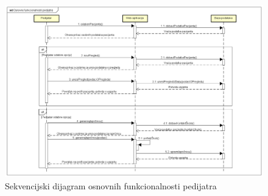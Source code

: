				\begin{figure}[H]
					\includegraphics[scale=0.35]{dijagrami/pedseq1.PNG} %
					\centering
					\caption{Sekvencijski dijagram osnovnih funkcionalnosti pedijatra}
					\label{fig:seq2}
				\end{figure}
				\clearpage
				
